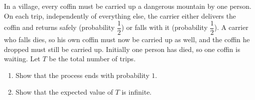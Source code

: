 In a village, every coffin must be carried up a dangerous mountain by one person. On each trip, independently of everything else, the carrier either delivers the coffin and returns safely (probability $\dfrac12$) or falls with it (probability $\dfrac12$). A carrier who falls dies, so his own coffin must now be carried up as well, and the coffin he dropped must still be carried up. Initially one person has died, so one coffin is waiting. Let $T$ be the total number of trips.
\begin{enumerate}
\item[(a)] Show that the process ends with probability $1$.
\item[(b)] Show that the expected value of $T$ is infinite.
\end{enumerate}
